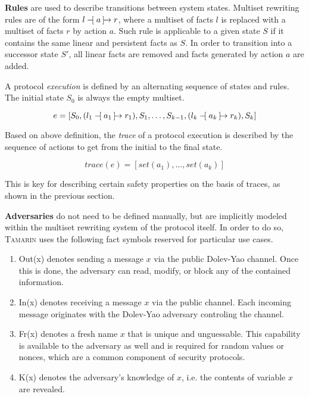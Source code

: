 \textbf{Rules} are used to describe transitions between system states.
Multiset rewriting rules are of the form $l \tracerule{a} r$, where a multiset of facts $l$ is replaced with a multiset of facts $r$ by action $a$.
Such rule is applicable to a given state $S$ if it contains the same linear and persistent facts as $S$.
In order to transition into a successor state $S'$, all linear facts are removed and facts generated by action $a$ are added.

\noindent
A protocol \textit{execution} is defined by an alternating sequence of states and rules. The initial state $S_0$ is always the empty multiset.

\begin{equation}\label{eq:execution}
    e = [S_0, (l_1 \tracerule{a_1} r_1), S_1, \ldots, S_{k-1}, (l_k \tracerule{a_k} r_k), S_k]
\end{equation}

\noindent
Based on above definition, the \textit{trace} of a protocol execution is described by the sequence of actions to get from the initial to the final state.

\begin{equation}
    trace(e) = [set(a_1), \ldots, set(a_k)]
\end{equation}

\noindent
This is key for describing certain safety properties on the basis of traces, as shown in the previous section.

\textbf{Adversaries} do not need to be defined manually, but are implicitly modeled within the multiset rewriting system of the protocol itself.
In order to do so, \textsc{Tamarin} uses the following fact symbols reserved for particular use cases.

\begin{enumerate}[label=--]
    \item \textsf{Out(x)} denotes sending a message $x$ via the public Dolev-Yao channel. Once this is done, the adversary can read, modify, or block any of the contained information.
    \item \textsf{In(x)} denotes receiving a message $x$ via the public channel. Each incoming message originates with the Dolev-Yao adversary controling the channel.
    \item \textsf{Fr(x)} denotes a fresh name $x$ that is unique and unguessable. This capability is available to the adversary as well and is required for random values or nonces, which are a common component of security protocols.
    \item \textsf{K(x)} denotes the adversary's knowledge of $x$, i.e. the contents of variable $x$ are revealed.
\end{enumerate}

